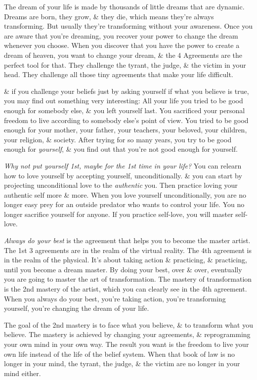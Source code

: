 \documentclass{article}
\numberwithin{equation}{section}
\begin{document}
The dream of your life is made by thousands of little dreams that are dynamic. Dreams are born, they grow, \& they die, which means they're always transforming. But usually they're transforming without your awareness. Once you are aware that you're dreaming, you recover your power to change the dream whenever you choose. When you discover that you have the power to create a dream of heaven, you want to change your dream, \& the 4 Agreements are the perfect tool for that. They challenge the tyrant, the judge, \& the victim in your head. They challenge all those tiny agreements that make your life difficult.

\& if you challenge your beliefs just by asking yourself if what you believe is true, you may find out something very interesting: All your life you tried to be good enough for somebody else, \& you left yourself last. You sacrificed your personal freedom to live according to somebody else's point of view. You tried to be good enough for your mother, your father, your teachers, your beloved, your children, your religion, \& society. After trying for so many years, you try to be good enough for \textit{yourself}, \& you find out that you're not good enough for yourself.

\textit{Why not put yourself 1st, maybe for the 1st time in your life?} You can relearn how to love yourself by accepting yourself, unconditionally. \& you can start by projecting unconditional love to the \textit{authentic} you. Then practice loving your authentic self more \& more. When you love yourself unconditionally, you are no longer easy prey for an outside predator who wants to control your life. You no longer sacrifice yourself for anyone. If you practice self-love, you will master self-love.

\textit{Always do your best} is the agreement that helps you to become the master artist. The 1st 3 agreements are in the realm of the virtual reality. The 4th agreement is in the realm of the physical. It's about taking action \& practicing, \& practicing, until you become a dream master. By doing your best, over \& over, eventually you are going to master the art of transformation. The mastery of transformation is the 2nd mastery of the artist, which you can clearly see in the 4th agreement. When you always do your best, you're taking action, you're transforming yourself, you're changing the dream of your life.

The goal of the 2nd mastery is to face what you believe, \& to transform what you believe. The mastery is achieved by changing your agreements, \& reprogramming your own mind in your own way. The result you want is the freedom to live your own life instead of the life of the belief system. When that book of law is no longer in your mind, the tyrant, the judge, \& the victim are no longer in your mind either.
\end{document}
